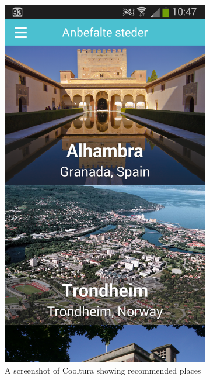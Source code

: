  
\begin{figure}
\centering
	\begin{subfigure}[h]{0.4\textwidth}
		\includegraphics[width=\textwidth]{fig/cooltura_screenshot1}
		\caption{A screenshot of Cooltura showing recommended places}
		\label{cooltura_screenshot1}
	\end{subfigure}
	\begin{subfigure}[h]{0.4\textwidth}

\end{subfigure}
\end{figure}
